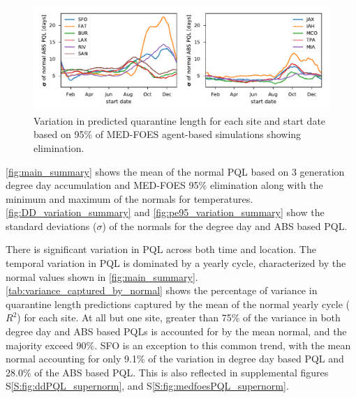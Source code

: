 \documentclass[10pt,a4paper,twocolumn]{article}
\begin{document}
\begin{figure}[ht!]
\centering
\includegraphics{figs/fig_pe95_variation.pdf}
\caption{\label{fig:pe95_variation_summary}Variation in predicted quarantine length 
for each site and start date
based on 95\% of MED-FOES agent-based simulations showing elimination.}
\end{figure}


\autoref{fig:main_summary} shows 
the mean of the normal PQL based on 3 generation degree day accumulation 
and MED-FOES 95\% elimination
along with the minimum and maximum of the normals for temperatures.
\autoref{fig:DD_variation_summary} and \autoref{fig:pe95_variation_summary} show the 
standard deviations ($\sigma$) of the normals for the degree day and ABS based PQL.

There is significant variation in PQL across both time and location.
The temporal variation in PQL is dominated by a yearly cycle, 
characterized by the normal values shown in \autoref{fig:main_summary}.
\autoref{tab:variance_captured_by_normal} shows the percentage of variance in 
quarantine length predictions captured by the mean of the normal yearly cycle ($R^2$) for each site.
At all but one site, greater than 75\% of the variance in both degree day and ABS based PQLs
is accounted for by the mean normal, and the majority exceed 90\%.
SFO is an exception to this common trend, with the mean normal accounting for only 9.1\% of the variation in 
degree day based PQL and 28.0\% of the ABS based PQL.
This is also reflected in supplemental figures
S\ref{S:fig:ddPQL_supernorm},
and S\ref{S:fig:medfoesPQL_supernorm}.
\end{document}
